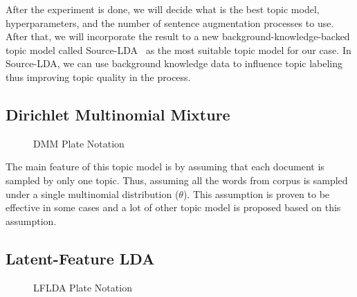 \documentclass[senior]{IPSstyle}
\begin{document}
After the experiment is done, we will decide what is the best topic model, hyperparameters, and the number of sentence augmentation processes to use. After that, we will incorporate the result to a new background-knowledge-backed topic model called Source-LDA~\cite{wood} as the most suitable topic model for our case. In Source-LDA, we can use background knowledge data to influence topic labeling thus improving topic
quality in the process.

\subsection{Dirichlet Multinomial Mixture~\cite{yin}}

\begin{figure}[h]
	\centering
	\caption{DMM Plate Notation}
\label{fig_dmm}
\end{figure}

The main feature of this topic model is by assuming that each document is sampled by only one topic. Thus, assuming all the words from corpus is sampled under a single multinomial distribution ($\theta$). This assumption is proven to be effective in some cases and a lot of other topic model is proposed based on this assumption.

\subsection{Latent-Feature LDA~\cite{nguyen}}
\label{subsec_lflda}

\begin{figure}[h]
	\centering
	\caption{LFLDA Plate Notation}
\label{fig_lflda}
\end{figure}
\end{document}

